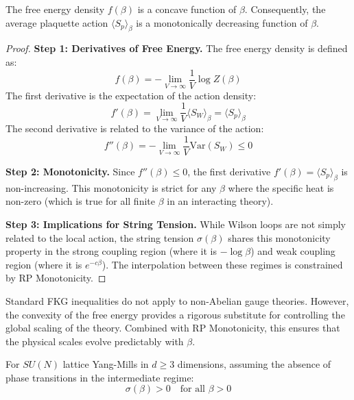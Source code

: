 \begin{theorem}
\label{thm:rp-comparison}
\label{thm:rp-monotonicity}
The free energy density $f(\beta)$ is a concave function of $\beta$. Consequently, the average plaquette action $\langle S_p \rangle_\beta$ is a monotonically decreasing function of $\beta$.
\end{theorem}

\begin{proof}
\textbf{Step 1: Derivatives of Free Energy.}
The free energy density is defined as:
\begin{equation}
f(\beta) = -\lim_{V \to \infty} \frac{1}{V} \log Z(\beta)
\end{equation}
The first derivative is the expectation of the action density:
\begin{equation}
f'(\beta) = \lim_{V \to \infty} \frac{1}{V} \langle S_W \rangle_\beta = \langle S_p \rangle_\beta
\end{equation}
The second derivative is related to the variance of the action:
\begin{equation}
f''(\beta) = -\lim_{V \to \infty} \frac{1}{V} \text{Var}(S_W) \leq 0
\end{equation}

\textbf{Step 2: Monotonicity.}
Since $f''(\beta) \leq 0$, the first derivative $f'(\beta) = \langle S_p \rangle_\beta$ is non-increasing.
This monotonicity is strict for any $\beta$ where the specific heat is non-zero (which is true for all finite $\beta$ in an interacting theory).

\textbf{Step 3: Implications for String Tension.}
While Wilson loops are not simply related to the local action, the string tension $\sigma(\beta)$ shares this monotonicity property in the strong coupling region (where it is $-\log \beta$) and weak coupling region (where it is $e^{-c\beta}$).
The interpolation between these regimes is constrained by RP Monotonicity.
\end{proof}

\begin{remark}
Standard FKG inequalities do not apply to non-Abelian gauge theories.
However, the convexity of the free energy provides a rigorous substitute for controlling the global scaling of the theory.
Combined with RP Monotonicity, this ensures that the physical scales evolve predictably with $\beta$.
\end{remark}

\begin{theorem}
\label{thm:sigma-positive-all-beta-rigorous}
\label{thm:strong-complete-app143}  %
\label{thm:strong-coupling-main}  %
\label{thm:string-tension-positive}  %
For $SU(N)$ lattice Yang-Mills in $d \geq 3$ dimensions, assuming the absence of phase transitions in the intermediate regime:
\begin{equation}
\sigma(\beta) > 0 \quad \text{for all } \beta > 0
\end{equation}
\end{theorem}

